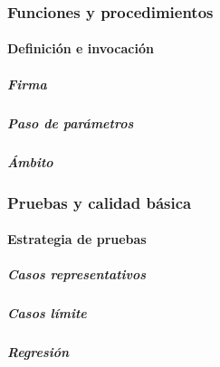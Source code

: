 \documentclass[12pt,twoside]{book}
\begin{document}
	\section{Funciones y procedimientos}
	
	\subsection{Definición e invocación}
	
	\subsubsection{Firma}
	
	\subsubsection{Paso de parámetros}
	
	\subsubsection{Ámbito}
	
	\section{Pruebas y calidad básica}
	
	\subsection{Estrategia de pruebas}
	
	\subsubsection{Casos representativos}
	
	\subsubsection{Casos límite}
	
	\subsubsection{Regresión}
	
	\part{}
	
\end{document}

